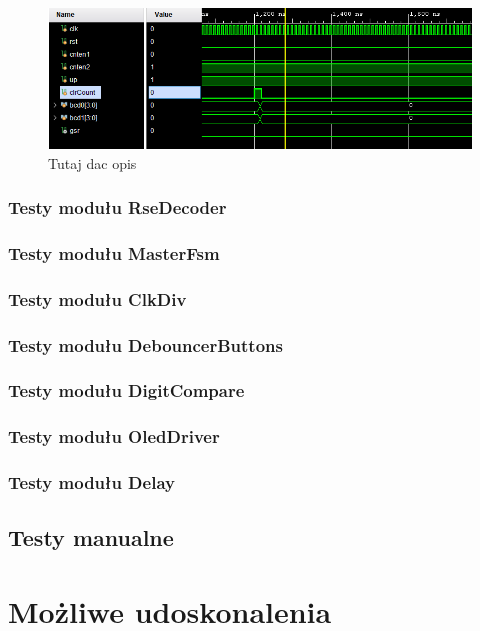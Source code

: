 \documentclass[12pt] {article}
\begin{document}
\begin{figure}[H]
\centering
\includegraphics[width=\textwidth]{res/behav_sims/Bcd2Dec_behavSim_2.png}
\caption{Tutaj dac opis}
\end{figure}

\subsubsection{Testy modułu RseDecoder}

\subsubsection{Testy modułu MasterFsm}



\subsubsection{Testy modułu ClkDiv}

\subsubsection{Testy modułu DebouncerButtons}

\subsubsection{Testy modułu DigitCompare}

\subsubsection{Testy modułu OledDriver}

\subsubsection{Testy modułu Delay}


\subsection{Testy manualne}


\section{Możliwe udoskonalenia}
\end{document}
